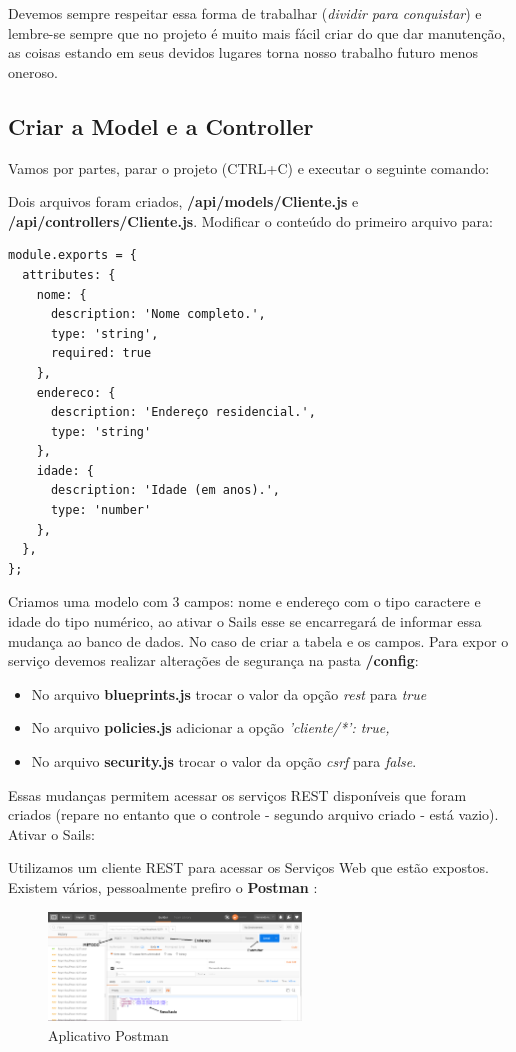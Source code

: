 \documentclass[a4paper,11pt]{article}
\begin{document}
Devemos sempre respeitar essa forma de trabalhar (\textit{dividir para conquistar}) e lembre-se sempre que no projeto é muito mais fácil criar do que dar manutenção, as coisas estando em seus devidos lugares torna nosso trabalho futuro menos oneroso.

\subsection{Criar a Model e a Controller}
Vamos por partes, parar o projeto (CTRL+C) e executar o seguinte comando: \\

Dois arquivos foram criados, \textbf{/api/models/Cliente.js} e \textbf{/api/controllers/Cliente.js}. Modificar o conteúdo do primeiro arquivo para:
\begin{lstlisting}
module.exports = {
  attributes: {
    nome: { 
      description: 'Nome completo.',
      type: 'string', 
      required: true 
    },
    endereco: { 
      description: 'Endereço residencial.',
      type: 'string' 
    },
    idade: { 
      description: 'Idade (em anos).',
      type: 'number' 
    },
  },
};
\end{lstlisting}

Criamos uma modelo com 3 campos: nome e endereço com o tipo caractere e idade do tipo numérico, ao ativar o Sails esse se encarregará de informar essa mudança ao banco de dados. No caso de criar a tabela e os campos. Para expor o serviço devemos realizar alterações de segurança na pasta \textbf{/config}: \vspace{-1em}
\begin{itemize}
	\item No arquivo \textbf{blueprints.js} trocar o valor da opção \textit{rest} para \textit{true}
	\item No arquivo \textbf{policies.js} adicionar a opção \textit{'cliente/*': true,}
	\item No arquivo \textbf{security.js}  trocar o valor da opção \textit{csrf} para \textit{false}.
\end{itemize}

Essas mudanças permitem acessar os serviços REST disponíveis que foram criados (repare no entanto que o controle - segundo arquivo criado - está vazio). Ativar o Sails: \\

Utilizamos um cliente REST para acessar os Serviços Web que estão expostos. Existem vários, pessoalmente prefiro o \textbf{Postman} \cite{postman}:
\begin{figure}[H]
	\centering
	\includegraphics[width=0.6\textwidth]{imagens/Postman.png}
	\caption{Aplicativo Postman}
\end{figure}
\end{document}
